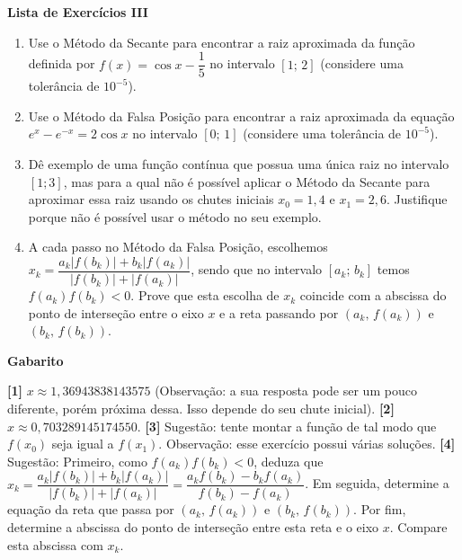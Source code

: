 \documentclass[12pt,a4paper]{article}
\begin{document}
\begin{center}
 \textbf{Lista de Exercícios III}
\end{center}

\begin{enumerate}
  \item Use o Método da Secante para encontrar a raiz aproximada da função definida por $f(x) = \cos x - \dfrac{1}{5}$ no intervalo $[1;\,2]$ (considere uma tolerância de $10^{-5}$).
  \item Use o Método da Falsa Posição para encontrar a raiz aproximada da equação $e^{x} - e^{-x} = 2\cos x$ no intervalo $[0;\,1]$ (considere uma tolerância de $10^{-5}$).
  \item Dê exemplo de uma função contínua que possua uma única raiz no intervalo $[1; 3]$, mas para a qual 
não é possível aplicar o Método da Secante para aproximar essa raiz usando os chutes iniciais 
$x_0 = 1,4$ e $x_1 = 2,6$. Justifique porque não é possível usar o método no seu exemplo.
  \item A cada passo no Método da Falsa Posição, escolhemos $x_k = \dfrac{a_k|f(b_k)| + b_k|f(a_k)|}{|f(b_k)|+|f(a_k)|}$, sendo que no intervalo $[a_k;\,b_k]$ temos $f(a_k)f(b_k)<0$. Prove que 
 esta escolha de $x_k$ coincide com a abscissa do ponto de interseção entre o eixo $x$ e a reta passando por $(a_k,\,f(a_k))$ e $(b_k,\,f(b_k))$.

\end{enumerate}

\begin{center}
\textbf{Gabarito}
\end{center}
\textbf{[1]} $x\approx 1,36943838143575$ (Observação: a sua resposta pode ser um pouco diferente, porém próxima dessa. Isso depende do seu chute inicial). 
\textbf{[2]} $x\approx 0,703289145174550$. 
\textbf{[3]} Sugestão: tente montar a função de tal modo que $f(x_0)$ seja igual a $f(x_1)$. Observação: esse exercício possui várias soluções. 
\textbf{[4]} Sugestão: Primeiro, como $f(a_k)f(b_k)<0$, deduza que $x_k = \dfrac{a_k|f(b_k)| + b_k|f(a_k)|}{|f(b_k)|+|f(a_k)|} = \dfrac{a_kf(b_k) - b_kf(a_k)}{f(b_k)-f(a_k)}$. 
Em seguida, determine a equação da reta que passa por $(a_k,\,f(a_k))$ e $(b_k,\,f(b_k))$. Por fim, 
determine a abscissa do ponto de interseção entre esta reta e o eixo $x$. Compare esta abscissa com $x_k$. 
\end{document}
